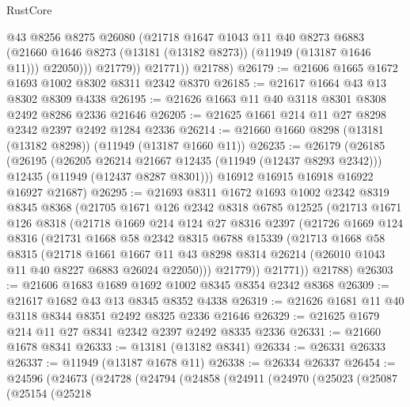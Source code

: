 \begin{lexlean}{RustCore}
\begin{coremodule}
                  @43
                  @8256
                  @8275
                  @26080
                  (@21718
                    @1647
                    @1043
                    @11
                    @40
                    @8273
                    @6883
                    (@21660 @1646 @8273 (@13181 (@13182 @8273)) (@11949 (@13187 @1646 @11)))
                    @22050)))
              @21779))
          @21771))
      @21788)
@26179 := @21606 @1665 @1672 @1693 @1002 @8302 @8311 @2342 @8370
@26185 := @21617 @1664 @43 @13 @8302 @8309 @4338
@26195 := @21626 @1663 @11 @40 @3118 @8301 @8308 @2492 @8286 @2336 @21646
@26205 := @21625 @1661 @214 @11 @27 @8298 @2342 @2397 @2492 @1284 @2336
@26214 := @21660 @1660 @8298 (@13181 (@13182 @8298)) (@11949 (@13187 @1660 @11))
@26235 := @26179
    (@26185
      (@26195
        (@26205 @26214 @21667 @12435 (@11949 (@12437 @8293 @2342)))
        @12435
        (@11949 (@12437 @8287 @8301)))
      @16912
      @16915
      @16918
      @16922
      @16927
      @21687)
@26295 := @21693
    @8311
    @1672
    @1693
    @1002
    @2342
    @8319
    @8345
    @8368
    (@21705
      @1671
      @126
      @2342
      @8318
      @6785
      @12525
      (@21713
        @1671
        @126
        @8318
        (@21718
          @1669
          @214
          @124
          @27
          @8316
          @2397
          (@21726
            @1669
            @124
            @8316
            (@21731
              @1668
              @58
              @2342
              @8315
              @6788
              @15339
              (@21713
                @1668
                @58
                @8315
                (@21718
                  @1661
                  @1667
                  @11
                  @43
                  @8298
                  @8314
                  @26214
                  (@26010 @1043 @11 @40 @8227 @6883 @26024 @22050)))
              @21779))
          @21771))
      @21788)
@26303 := @21606 @1683 @1689 @1692 @1002 @8345 @8354 @2342 @8368
@26309 := @21617 @1682 @43 @13 @8345 @8352 @4338
@26319 := @21626 @1681 @11 @40 @3118 @8344 @8351 @2492 @8325 @2336 @21646
@26329 := @21625 @1679 @214 @11 @27 @8341 @2342 @2397 @2492 @8335 @2336
@26331 := @21660 @1678 @8341
@26333 := @13181 (@13182 @8341)
@26334 := @26331 @26333
@26337 := @11949 (@13187 @1678 @11)
@26338 := @26334 @26337
@26454 := @24596
    (@24673
      (@24728
        (@24794
          (@24858
            (@24911
              (@24970
                (@25023
                  (@25087
                    (@25154
                      (@25218

\end{coremodule}
\end{lexlean}
